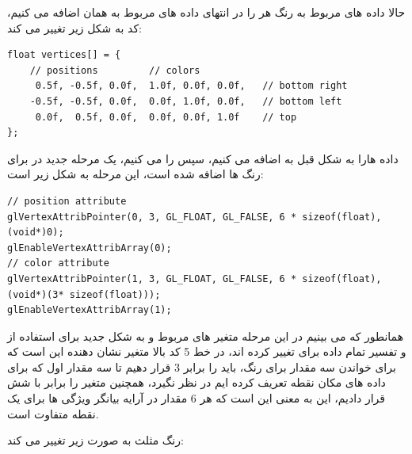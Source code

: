 \documentclass[a4paper, 12pt]{book}
\newcommand{\lrit}[1]{\lr{\textit{#1}}}
\begin{document}
    حالا داده های مربوط به رنگ هر  را در انتهای داده های مربوط به همان  اضافه می کنیم، کد به شکل زیر تغییر می کند:
    \begin{LTR}
    \small
        \begin{lstlisting}[style=C++Style,caption=\lrit{position and color data in one array}]
float vertices[] = {
    // positions         // colors
     0.5f, -0.5f, 0.0f,  1.0f, 0.0f, 0.0f,   // bottom right
    -0.5f, -0.5f, 0.0f,  0.0f, 1.0f, 0.0f,   // bottom left
     0.0f,  0.5f, 0.0f,  0.0f, 0.0f, 1.0f    // top
};
        \end{lstlisting}
    \end{LTR}
    \normalsize
    \vspace*{0.3cm}

    داده هارا به شکل قبل به  اضافه می کنیم، سپس  را  می کنیم، یک مرحله جدید در  برای رنگ ها اضافه شده است، این مرحله به شکل زیر است:
       \begin{LTR}
    \small
        \begin{lstlisting}[style=C++Style,caption=\lrit{position and color data in one array}]
// position attribute
glVertexAttribPointer(0, 3, GL_FLOAT, GL_FALSE, 6 * sizeof(float), (void*)0);
glEnableVertexAttribArray(0);
// color attribute
glVertexAttribPointer(1, 3, GL_FLOAT, GL_FALSE, 6 * sizeof(float), (void*)(3* sizeof(float)));
glEnableVertexAttribArray(1);
        \end{lstlisting}
    \end{LTR}
    \normalsize
    \vspace*{0.3cm}

    همانطور که می بینیم در این مرحله متغیر های مربوط  و  به شکل جدید برای استفاده از و تفسیر تمام داده برای  تغییر کرده اند، در خط 5 کد بالا متغیر  نشان دهنده این است که برای خواندن سه مقدار برای رنگ، باید  را برابر 3 قرار دهیم تا سه مقدار اول که برای داده های مکان نقطه تعریف کرده ایم در نظر نگیرد، همچنین متغیر  را برابر با شش قرار دادیم، این به معنی این است که هر 6 مقدار در آرایه بیانگر ویژگی ها برای یک نقطه متفاوت است.\par
    رنگ مثلث به صورت زیر تغییر می کند:
\end{document}
